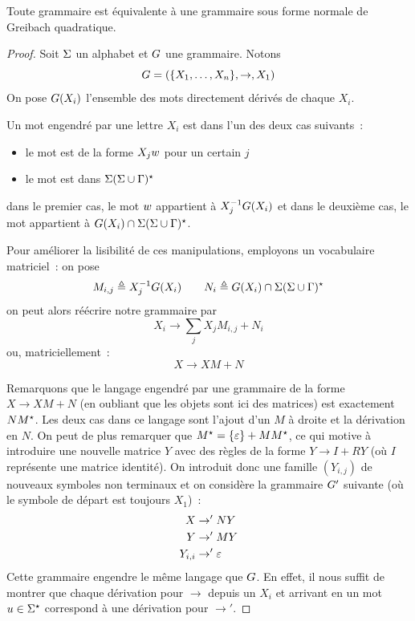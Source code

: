 \begin{proposition}
  Toute grammaire est équivalente à une grammaire sous forme normale de Greibach
  quadratique.
\end{proposition}

\begin{proof}
  Soit $\Sigma$ un alphabet et $G$ une grammaire. Notons
  \[G = (\{X_1,\ldots,X_n\}, \to, X_1)\]
  On pose $G(X_i)$ l'ensemble des mots directement dérivés de chaque
  $X_i$.

  Un mot engendré par une lettre $X_i$ est dans l'un des deux cas suivants~:
  \begin{itemize}
  \item le mot est de la forme $X_j w$ pour un certain $j$
  \item le mot est dans $\Sigma(\Sigma\cup\Gamma)^{\star}$
  \end{itemize}
  dans le premier cas, le mot $w$ appartient à $X_j^{-1}G(X_i)$ et dans
  le deuxième cas, le mot appartient à $G(X_i) \cap \Sigma(\Sigma\cup\Gamma)^{\star}$.

  Pour améliorer la lisibilité de ces manipulations, employons un vocabulaire
  matriciel~: on pose
  \[ M_{i,j} \triangleq X_j^{-1}G(X_i) \qquad
  N_{i} \triangleq G(X_i) \cap \Sigma(\Sigma\cup\Gamma)^{\star}\]
  on peut alors réécrire notre grammaire par
  \[X_i \to \sum_{j} X_j M_{i,j} + N_i\]
  ou, matriciellement~:
  \[X \to X M + N\]
  
  Remarquons que le langage engendré par une grammaire de la forme
  $X \to XM + N$
  (en oubliant que les objets sont ici des matrices) est exactement $NM^{\star}$.
  Les deux cas dans ce langage sont l'ajout d'un $M$ à droite et la dérivation
  en $N$.
  On peut de plus remarquer que $M^{\star} = \{\varepsilon\} + MM^{\star}$, ce qui
  motive à
  introduire une nouvelle matrice $Y$ avec des règles de la forme $Y \to I + RY$
  (où $I$ représente une matrice identité).
  On introduit donc une famille $(Y_{i,j})$ de nouveaux symboles non terminaux
  et on considère la grammaire $G'$ suivante (où le symbole de départ est
  toujours $X_1$)~:
  \begin{align*}
    X &\to' NY \\
    Y &\to' MY \\
    Y_{i,i} &\to' \varepsilon
  \end{align*}
  Cette grammaire engendre le même langage que $G$. En effet, il nous
  suffit de montrer que chaque dérivation pour $\to$ depuis un $X_i$ et arrivant
  en un mot $u \in \Sigma^{\star}$ correspond à une dérivation pour $\to'$.


\end{proof}

